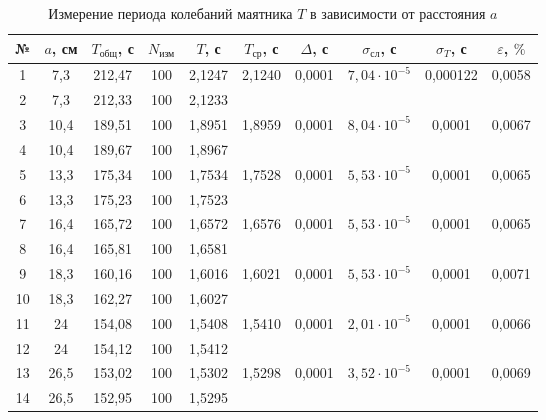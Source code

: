 \documentclass[a4paper,12pt]{article} %
\begin{document}
\begin{table}[h!!]
	\begin{center}
		\begin{tabular}{|c|c|c|c|c|c|c|c|c|c|}
		\hline
		№ &
		$ a $, см &
		$ T_\text{общ} $, с &
		$ N_\text{изм} $ &
		$ T $, с &
		$ T_\text{ср} $, с &
		$ \Delta $, с &
		$ \sigma_\text{сл} $, с &
		$ \sigma_T$, с &
		$ \varepsilon $, $ \% $ \\ \hline
		1 &
		7,3 &
		212,47 &
		100 &
		2,1247 &
		\multirow{2}{*}{2,1240} &
		\multirow{2}{*}{0,0001} &
		\multirow{2}{*}{$7,04 \cdot 10^{-5}$} &
		\multirow{2}{*}{0,000122} &
		\multirow{2}{*}{0,0058} \\ \cline{1-5}
		2 &
		7,3 &
		212,33 &
		100 &
		2,1233 &
		&
		&
		&
		&
		\\ \hline
		3 &
		10,4 &
		189,51 &
		100 &
		1,8951 &
		\multirow{2}{*}{1,8959} &
		\multirow{2}{*}{0,0001} &
		\multirow{2}{*}{$8,04 \cdot 10^{-5}$} &
		\multirow{2}{*}{0,0001} &
		\multirow{2}{*}{0,0067} \\ \cline{1-5}
		4 &
		10,4 &
		189,67 &
		100 &
		1,8967 &
		&
		&
		&
		&
		\\ \hline
		5 &
		13,3 &
		175,34 &
		100 &
		1,7534 &
		\multirow{2}{*}{1,7528} &
		\multirow{2}{*}{0,0001} &
		\multirow{2}{*}{$5,53 \cdot 10^{-5}$} &
		\multirow{2}{*}{0,0001} &
		\multirow{2}{*}{0,0065} \\ \cline{1-5}
		6 &
		13,3 &
		175,23 &
		100 &
		1,7523 &
		&
		&
		&
		&
		\\ \hline
		7 &
		16,4 &
		165,72 &
		100 &
		1,6572 &
		\multirow{2}{*}{1,6576} &
		\multirow{2}{*}{0,0001} &
		\multirow{2}{*}{$5,53 \cdot 10^{-5}$} &
		\multirow{2}{*}{0,0001} &
		\multirow{2}{*}{0,0065} \\ \cline{1-5}
		8 &
		16,4 &
		165,81 &
		100 &
		1,6581 &
		&
		&
		&
		&
		\\ \hline
		9 &
		18,3 &
		160,16 &
		100 &
		1,6016 &
		\multirow{2}{*}{1,6021} &
		\multirow{2}{*}{0,0001} &
		\multirow{2}{*}{$5,53 \cdot 10^{-5}$} &
		\multirow{2}{*}{0,0001} &
		\multirow{2}{*}{0,0071} \\ \cline{1-5}
		10 &
		18,3 &
		162,27 &
		100 &
		1,6027 &
		&
		&
		&
		&
		\\ \hline
		11 &
		24 &
		154,08 &
		100 &
		1,5408 &
		\multirow{2}{*}{1,5410} &
		\multirow{2}{*}{0,0001} &
		\multirow{2}{*}{$2,01 \cdot 10^{-5}$} &
		\multirow{2}{*}{0,0001} &
		\multirow{2}{*}{0,0066} \\ \cline{1-5}
		12 &
		24 &
		154,12 &
		100 &
		1,5412 &
		&
		&
		&
		&
		\\ \hline
		13 &
		26,5 &
		153,02 &
		100 &
		1,5302 &
		\multirow{2}{*}{1,5298} &
		\multirow{2}{*}{0,0001} &
		\multirow{2}{*}{$3,52 \cdot 10^{-5}$} &
		\multirow{2}{*}{0,0001} &
		\multirow{2}{*}{0,0069} \\ \cline{1-5}
		14 &
		26,5 &
		152,95 &
		100 &
		1,5295 &
		&
		&
		&
		&
		\\ \hline
	\end{tabular}
	\end{center}
\caption{Измерение периода колебаний маятника $ T $ в зависимости от расстояния $ a $}
\label{tab2}
\end{table}
\end{document}

